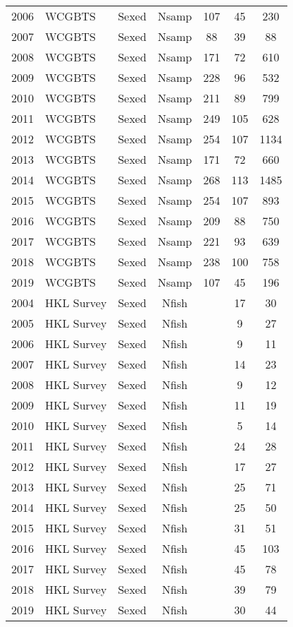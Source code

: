 \begin{longtable}[t]{c>{\centering\arraybackslash}p{3cm}ccccc}
2006 & WCGBTS & Sexed & Nsamp & 107 & 45 & 230\\
2007 & WCGBTS & Sexed & Nsamp & 88 & 39 & 88\\
2008 & WCGBTS & Sexed & Nsamp & 171 & 72 & 610\\
2009 & WCGBTS & Sexed & Nsamp & 228 & 96 & 532\\
2010 & WCGBTS & Sexed & Nsamp & 211 & 89 & 799\\
2011 & WCGBTS & Sexed & Nsamp & 249 & 105 & 628\\
2012 & WCGBTS & Sexed & Nsamp & 254 & 107 & 1134\\
2013 & WCGBTS & Sexed & Nsamp & 171 & 72 & 660\\
2014 & WCGBTS & Sexed & Nsamp & 268 & 113 & 1485\\
2015 & WCGBTS & Sexed & Nsamp & 254 & 107 & 893\\
2016 & WCGBTS & Sexed & Nsamp & 209 & 88 & 750\\
2017 & WCGBTS & Sexed & Nsamp & 221 & 93 & 639\\
2018 & WCGBTS & Sexed & Nsamp & 238 & 100 & 758\\
2019 & WCGBTS & Sexed & Nsamp & 107 & 45 & 196\\
2004 & HKL Survey & Sexed & Nfish &  & 17 & 30\\
2005 & HKL Survey & Sexed & Nfish &  & 9 & 27\\
2006 & HKL Survey & Sexed & Nfish &  & 9 & 11\\
2007 & HKL Survey & Sexed & Nfish &  & 14 & 23\\
2008 & HKL Survey & Sexed & Nfish &  & 9 & 12\\
2009 & HKL Survey & Sexed & Nfish &  & 11 & 19\\
2010 & HKL Survey & Sexed & Nfish &  & 5 & 14\\
2011 & HKL Survey & Sexed & Nfish &  & 24 & 28\\
2012 & HKL Survey & Sexed & Nfish &  & 17 & 27\\
2013 & HKL Survey & Sexed & Nfish &  & 25 & 71\\
2014 & HKL Survey & Sexed & Nfish &  & 25 & 50\\
2015 & HKL Survey & Sexed & Nfish &  & 31 & 51\\
2016 & HKL Survey & Sexed & Nfish &  & 45 & 103\\
2017 & HKL Survey & Sexed & Nfish &  & 45 & 78\\
2018 & HKL Survey & Sexed & Nfish &  & 39 & 79\\
2019 & HKL Survey & Sexed & Nfish &  & 30 & 44\\

\end{longtable}
